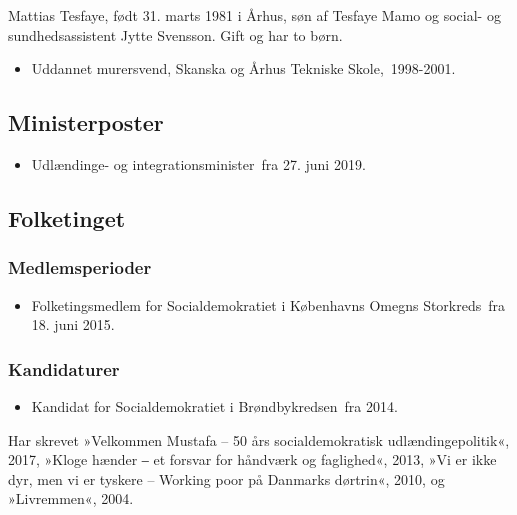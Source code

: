\documentclass[11pt, a4paper]{awesome-cv}
\begin{document}
\makecvheader[R]
\makelettertitle
\begin{cvletter}
Mattias Tesfaye, født 31. marts 1981 i Århus, søn af Tesfaye Mamo og social- og sundhedsassistent Jytte Svensson. Gift og har to børn.

\begin{itemize}
\item Uddannet murersvend, Skanska og Århus Tekniske Skole, 1998-2001.
\end{itemize}
\subsection*{Ministerposter}
\begin{itemize}
\item Udlændinge- og integrationsminister fra 27. juni 2019.
\end{itemize}
\subsection*{Folketinget}
\subsubsection*{Medlemsperioder}
\begin{itemize}
\item Folketingsmedlem for Socialdemokratiet i Københavns Omegns Storkreds fra 18. juni 2015.
\end{itemize}
\subsubsection*{Kandidaturer}
\begin{itemize}
\item Kandidat for Socialdemokratiet i Brøndbykredsen fra 2014.
\end{itemize}
Har skrevet »Velkommen Mustafa – 50 års socialdemokratisk udlændingepolitik«, 2017, »Kloge hænder ‒ et forsvar for håndværk og faglighed«, 2013, »Vi er ikke dyr, men vi er tyskere – Working poor på Danmarks dørtrin«, 2010, og »Livremmen«, 2004.

\end{cvletter}
\end{document}
